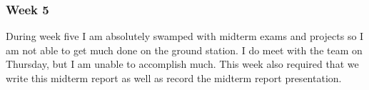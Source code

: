 \subsubsection{Week 5}
During week five I am absolutely swamped with midterm exams and projects so I am not able to get much done on the ground station. 
I do meet with the team on Thursday, but I am unable to accomplish much.
This week also required that we write this midterm report as well as record the midterm report presentation.









